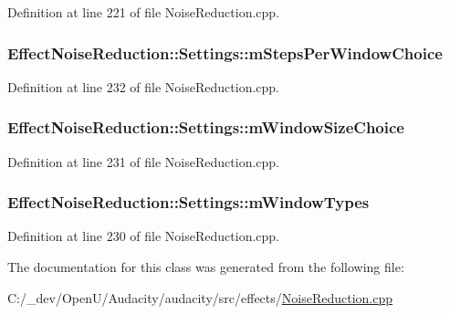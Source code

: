 Definition at line 221 of file Noise\+Reduction.\+cpp.

\subsubsection[{\texorpdfstring{m\+Steps\+Per\+Window\+Choice}{mStepsPerWindowChoice}}]{ Effect\+Noise\+Reduction\+::\+Settings\+::m\+Steps\+Per\+Window\+Choice}\hypertarget{class_effect_noise_reduction_1_1_settings_a51c0443b45ef45fadc76e299f8e07c6c}{}\label{class_effect_noise_reduction_1_1_settings_a51c0443b45ef45fadc76e299f8e07c6c}


Definition at line 232 of file Noise\+Reduction.\+cpp.

\subsubsection[{\texorpdfstring{m\+Window\+Size\+Choice}{mWindowSizeChoice}}]{ Effect\+Noise\+Reduction\+::\+Settings\+::m\+Window\+Size\+Choice}\hypertarget{class_effect_noise_reduction_1_1_settings_a06c90e5f69a35bb37d88949331fde123}{}\label{class_effect_noise_reduction_1_1_settings_a06c90e5f69a35bb37d88949331fde123}


Definition at line 231 of file Noise\+Reduction.\+cpp.

\subsubsection[{\texorpdfstring{m\+Window\+Types}{mWindowTypes}}]{ Effect\+Noise\+Reduction\+::\+Settings\+::m\+Window\+Types}\hypertarget{class_effect_noise_reduction_1_1_settings_a58e3a556866b785b7cd9d8203ab58518}{}\label{class_effect_noise_reduction_1_1_settings_a58e3a556866b785b7cd9d8203ab58518}


Definition at line 230 of file Noise\+Reduction.\+cpp.



The documentation for this class was generated from the following file\+:\begin{DoxyCompactItemize}
\item 
C\+:/\+\_\+dev/\+Open\+U/\+Audacity/audacity/src/effects/\hyperlink{_noise_reduction_8cpp}{Noise\+Reduction.\+cpp}\end{DoxyCompactItemize}
